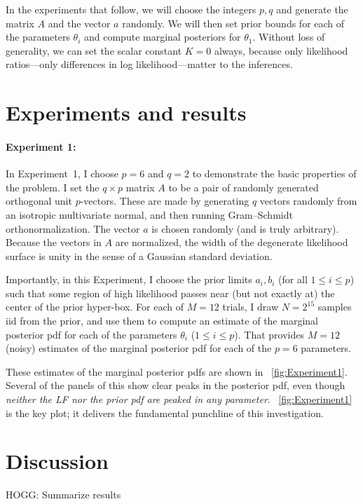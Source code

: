 \documentclass[10pt]{article}
\newcommand{\figref}[1]{\figurename~\ref{#1}}
\begin{document}
In the experiments that follow, we will choose the integers $p, q$ and generate the matrix $A$ and the vector $a$ randomly.
We will then set prior bounds for each of the parameters $\theta_i$ and compute marginal posteriors for $\theta_1$.
Without loss of generality, we can set the scalar constant $K=0$ always, because only likelihood ratios---only differences in log likelihood---matter to the inferences.

\section{Experiments and results}
\paragraph{Experiment 1:}
In Experiment~1, I choose $p=6$ and $q=2$ to demonstrate the basic properties of the problem.
I set the $q\times p$ matrix $A$ to be a pair of randomly generated orthogonal unit $p$-vectors.
These are made by generating $q$ vectors randomly from an isotropic multivariate normal, and then running Gram--Schmidt orthonormalization.
The vector $a$ is chosen randomly (and is truly arbitrary).
Because the vectors in $A$ are normalized, the width of the degenerate likelihood surface is unity in the sense of a Gaussian standard deviation.

Importantly, in this Experiment, I choose the prior limits $a_i, b_i$ (for all $1\leq i\leq p$) such that some region of high likelihood passes near (but not exactly at) the center of the prior hyper-box.
For each of $M=12$ trials, I draw $N=2^15$ samples iid from the prior, and use them to compute an estimate of the marginal posterior pdf for each of the parameters $\theta_i$ ($1\leq i\leq p$).
That provides $M=12$ (noisy) estimates of the marginal posterior pdf for each of the $p=6$ parameters.

These estimates of the marginal posterior pdfs are shown in \figref{fig:Experiment1}.
Several of the panels of this \figurename{} show clear peaks in the posterior pdf, even though \emph{neither the LF nor the prior pdf are peaked in any parameter}.
\figref{fig:Experiment1} is the key plot; it delivers the fundamental punchline of this investigation.

\section{Discussion}

HOGG: Summarize results
\end{document}
